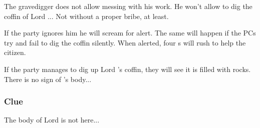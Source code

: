 The gravedigger does not allow messing with his work. He won't allow to dig the coffin of Lord \npcKharbranthNoble{}... Not without a proper bribe, at least.

If the party ignores him he will scream for alert. The same will happen if the PCs try and fail to dig the coffin silently. When alerted, four \enemyDiagramMuscle{}s will rush to help the citizen.

If the party manages to dig up Lord \npcKharbranthNoble{}'s coffin, they will see it is filled with rocks. There is no sign of \npcKharbranthNoble{}'s body...

\subsubsection{Clue}

The body of Lord \npcKharbranthNoble{} is not here...